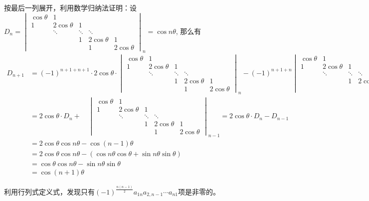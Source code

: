 \item[(4)] 按最后一列展开，利用数学归纳法证明：设
$D_n = \begin{vmatrix} \cos\theta & 1 & & & \\ 1 & 2\cos\theta & 1 & & \\ & \ddots & \ddots & \ddots & \\ & & 1 & 2\cos\theta & 1 \\ & & & 1 & 2\cos\theta \end{vmatrix}_n = \cos n\theta$, 那么有
\begin{align*}
    D_{n+1} & = (-1)^{n+1+n+1} \cdot 2\cos\theta \cdot \begin{vmatrix} \cos\theta & 1 & & & \\ 1 & 2\cos\theta & 1 & & \\ & \ddots & \ddots & \ddots & \\ & & 1 & 2\cos\theta & 1 \\ & & & 1 & 2\cos\theta \end{vmatrix}_{n} - (-1)^{n+1+n}\begin{vmatrix} \cos\theta & 1 & & & \\ 1 & 2\cos\theta & 1 & & \\ & \ddots & \ddots & \ddots & \\ & & 1 & 2\cos\theta & 1 \\ & & & & 1 \end{vmatrix}_{n} \\
    & = 2\cos\theta \cdot D_{n} + \quad \begin{vmatrix} \cos\theta & 1 & & & \\ 1 & 2\cos\theta & 1 & & \\ & \ddots & \ddots & \ddots & \\ & & 1 & 2\cos\theta & 1 \\ & & & 1 & 2\cos\theta \end{vmatrix}_{n-1} = 2\cos\theta \cdot D_{n} - D_{n-1} \\
    & = 2\cos\theta \cos n\theta - \cos (n-1)\theta \\
    & = 2\cos\theta \cos n\theta - (\cos n\theta \cos\theta + \sin n\theta \sin\theta) \\ 
    & = \cos\theta \cos n\theta - \sin n\theta \sin\theta \\
    & = \cos (n+1)\theta
\end{align*}

\item[(5)] 利用行列式定义式，发现只有$(-1)^{\frac{n(n-1)}{2}}a_{1n}a_{2,n-1}\cdots a_{n1}$项是非零的。

